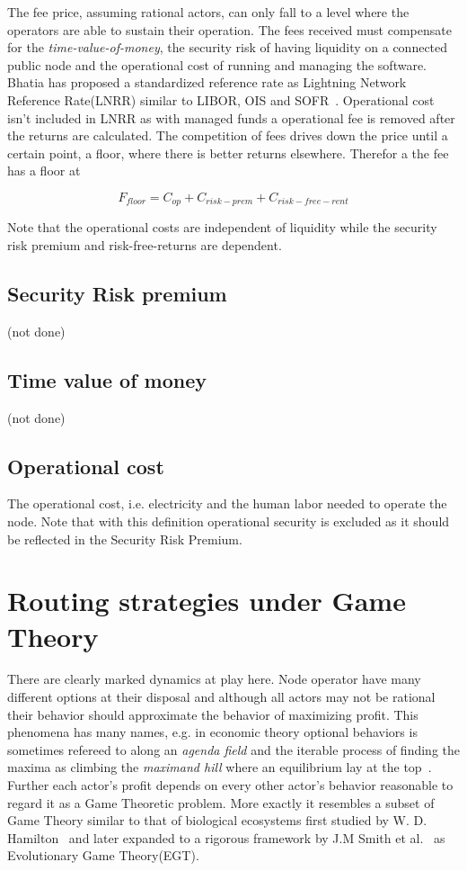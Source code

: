 The fee price, assuming rational actors, can only fall to a level where the operators are able to sustain their operation. The fees received must compensate for the \textit{time-value-of-money}, the security risk of having liquidity on a connected public node and the operational cost of running and managing the software. Bhatia has proposed a standardized reference rate as Lightning Network Reference Rate(LNRR) similar to LIBOR, OIS and SOFR~\cite{bhatia:time:value}. Operational cost isn't included in LNRR as with managed funds a  operational fee is removed after the returns are calculated. The competition of fees drives down the price until a certain point, a floor, where there is better returns elsewhere. Therefor a the fee has a floor at

\[ F_{floor} = C_{op} + C_{risk-prem} + C_{risk-free-rent} \]

Note that the operational costs are independent of liquidity while the security risk premium and risk-free-returns are dependent.

\subsection{Security Risk premium}
(not done)
\subsection{Time value of money}
(not done)
\subsection{Operational cost}

The operational cost, i.e. electricity and the human labor needed to operate the node. Note that with this definition operational security is excluded as it should be reflected in the Security Risk Premium.  

\section{Routing strategies under Game Theory}

There are clearly marked dynamics at play here. Node operator have many different options at their disposal and although all actors may not be rational their behavior should approximate the behavior of maximizing profit. This phenomena has many names, e.g. in economic theory optional behaviors is sometimes refereed to along an \textit{agenda field} and the iterable process of finding the maxima as climbing the \textit{maximand hill} where an equilibrium lay at the top~\cite{boulding:evolutionary:economy}. Further each actor's profit depends on every other actor's behavior reasonable to regard it as a Game Theoretic problem. More exactly it resembles a subset of Game Theory similar to that of biological ecosystems first studied by W. D. Hamilton~\cite{hamilton:behavior} and later expanded to a rigorous framework by J.M Smith et al.~\cite{smith:price:logic:animal, smith:evolution:games} as Evolutionary Game Theory(EGT).


